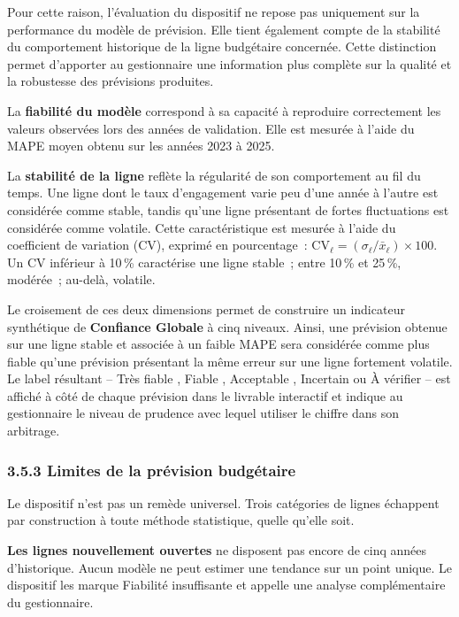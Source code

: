 Pour cette raison, l'\'evaluation du dispositif ne repose pas uniquement sur
la performance du mod\`ele de pr\'evision. Elle tient \'egalement compte de
la stabilit\'e du comportement historique de la ligne budg\'etaire
concern\'ee. Cette distinction permet d'apporter au gestionnaire une
information plus compl\`ete sur la qualit\'e et la robustesse des pr\'evisions
produites.

La \textbf{fiabilit\'e du mod\`ele} correspond \`a sa capacit\'e \`a
reproduire correctement les valeurs observ\'ees lors des ann\'ees de
validation. Elle est mesur\'ee \`a l'aide du MAPE moyen obtenu sur les
ann\'ees 2023 \`a 2025.

La \textbf{stabilit\'e de la ligne} refl\`ete la r\'egularit\'e de son
comportement au fil du temps. Une ligne dont le taux d'engagement varie peu
d'une ann\'ee \`a l'autre est consid\'er\'ee comme stable, tandis qu'une
ligne pr\'esentant de fortes fluctuations est consid\'er\'ee comme volatile.
Cette caract\'eristique est mesur\'ee \`a l'aide du coefficient de variation
(CV), exprim\'e en pourcentage~: $\mathrm{CV}_\ell = (\sigma_\ell / \bar{x}_\ell)\times 100$.
Un CV inf\'erieur \`a 10\,\% caract\'erise une ligne stable~; entre 10\,\% et
25\,\%, mod\'er\'ee~; au-del\`a, volatile.

Le croisement de ces deux dimensions permet de construire un indicateur
synth\'etique de \textbf{Confiance Globale} \`a cinq niveaux. Ainsi, une
pr\'evision obtenue sur une ligne stable et associ\'ee \`a un faible MAPE
sera consid\'er\'ee comme plus fiable qu'une pr\'evision pr\'esentant la
m\^eme erreur sur une ligne fortement volatile. Le label r\'esultant -- \og
Tr\`es fiable \fg{}, \og Fiable \fg{}, \og Acceptable \fg{}, \og Incertain \fg{}
ou \og \`A v\'erifier \fg{} -- est affich\'e \`a c\^ot\'e de chaque
pr\'evision dans le livrable interactif et indique au gestionnaire le niveau
de prudence avec lequel utiliser le chiffre dans son arbitrage.

\subsubsection*{3.5.3 \quad Limites de la pr\'evision budg\'etaire}

Le dispositif n'est pas un rem\`ede universel. Trois cat\'egories de lignes
\'echappent par construction \`a toute m\'ethode statistique, quelle qu'elle
soit.

\textbf{Les lignes nouvellement ouvertes} ne disposent pas encore de cinq
ann\'ees d'historique. Aucun mod\`ele ne peut estimer une tendance sur un
point unique. Le dispositif les marque \og Fiabilit\'e insuffisante \fg{} et
appelle une analyse compl\'ementaire du gestionnaire.

